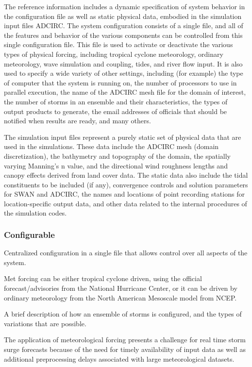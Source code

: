 \documentclass[12pt]{article}
\begin{document}
The reference information includes a dynamic specification of system 
behavior in the configuration file as well as static physical data, 
embodied in the simulation input files ADCIRC. The system 
configuration consists of a single file, and all of the features and 
behavior of the various components can be controlled from this 
single configuration file. This file is used to activate or 
deactivate the various types of physical forcing, including tropical 
cyclone meteorology, ordinary meteorology, wave simulation and 
coupling, tides, and river flow input. It is also used to specify a 
wide variety of other settings, including (for example) the type of 
computer that the system is running on, the number of processors to 
use in parallel execution, the name of the ADCIRC mesh file for the 
domain of interest, the number of storms in an ensemble and their 
characteristics, the types of output products to generate, the email 
addresses of officials that should be notified when results are 
ready, and many others. 

The simulation input files represent a purely static set of physical 
data that are used in the simulations. These data include the ADCIRC 
mesh (domain discretization), the bathymetry and topography of the 
domain, the spatially varying Manning's n value, and the directional 
wind roughness lengths and canopy effects derived from land cover 
data. The static data also include the tidal constituents to be 
included (if any), convergence controls and solution parameters for 
SWAN and ADCIRC, the names and locations of point recording stations 
for location-specific output data, and other data related to the 
internal procedures of the simulation codes. 

\subsubsection{Configurable}

Centralized configuration in a single file that allows control over all
aspects of the system. 

Met forcing can be either tropical cyclone driven, using the official 
forecast/advisories from the National Hurricane Center, or it can be 
driven by ordinary meteorology from the North American Mesoscale model 
from NCEP.

A brief description of how an ensemble of storms is configured, 
and the types of variations that are possible. 

The application of meteorological forcing presents a challenge for 
real time storm surge forecasts because of the need for timely 
availability of input data as well as additional preprocessing 
delays associated with large meteorological datasets. 
\end{document}
